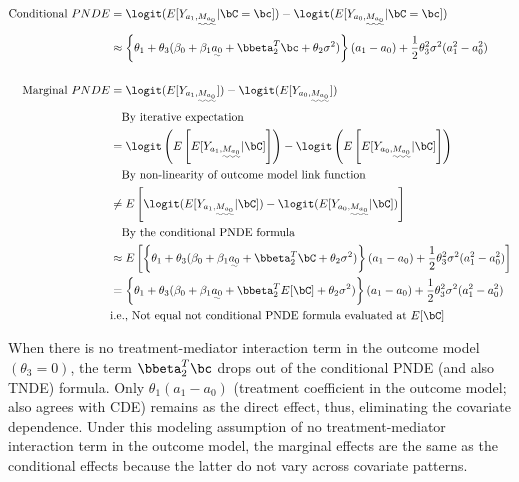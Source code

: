 \documentclass[10pt]{article}
\begin{document}
\begin{align*}
  \text{Conditional }PNDE
  &= \logit(E[Y_{a_{1},\uwave{M_{a_{0}}}} | \bC = \bc]) - \logit(E[Y_{a_{0},\uwave{M_{a_{0}}}} | \bC = \bc])\\
  &\approx \left\{ \theta_{1} + \theta_{3}(\beta_{0} + \beta_{1}\uwave{a_{0}} + \bbeta_{2}^{T}\bc + \theta_{2}\sigma^{2}) \right\} (a_{1} - a_{0}) + \frac{1}{2} \theta_{3}^{2}\sigma^{2}(a_{1}^{2} - a_{0}^{2})\\
  \\
  \text{Marginal }PNDE
  &= \logit(E[Y_{a_{1},\uwave{M_{a_{0}}}}]) - \logit(E[Y_{a_{0},\uwave{M_{a_{0}}}}])\\
  &~~~\text{By iterative expectation}\\
  &= \logit\left(E \left[ E[Y_{a_{1},\uwave{M_{a_{0}}}} | \bC] \right]\right) - \logit\left(E \left[ E[Y_{a_{0},\uwave{M_{a_{0}}}} | \bC] \right]\right)\\
  &~~~\text{By non-linearity of outcome model link function}\\
  &\ne E \left[ \logit(E[Y_{a_{1},\uwave{M_{a_{0}}}} | \bC]) - \logit(E[Y_{a_{0},\uwave{M_{a_{0}}}} | \bC]) \right]\\
  &~~~\text{By the conditional PNDE formula}\\
  &\approx E \left[ \left\{ \theta_{1} + \theta_{3}(\beta_{0} + \beta_{1}\uwave{a_{0}} + \bbeta_{2}^{T}\bC + \theta_{2}\sigma^{2}) \right\} (a_{1} - a_{0}) + \frac{1}{2} \theta_{3}^{2}\sigma^{2}(a_{1}^{2} - a_{0}^{2}) \right]\\
  &= \left\{ \theta_{1} + \theta_{3}(\beta_{0} + \beta_{1}\uwave{a_{0}} + \bbeta_{2}^{T}E[\bC] + \theta_{2}\sigma^{2}) \right\} (a_{1} - a_{0}) + \frac{1}{2} \theta_{3}^{2}\sigma^{2}(a_{1}^{2} - a_{0}^{2})\\
  &\text{i.e., Not equal not conditional PNDE formula evaluated at }E[\bC]\\
\end{align*}

When there is no treatment-mediator interaction term in the outcome model \((\theta_{3} = 0)\), the term \(\bbeta_{2}^{T}\bc\) drops out of the conditional PNDE (and also TNDE) formula. Only \(\theta_{1}(a_{1} - a_{0})\) (treatment coefficient in the outcome model; also agrees with CDE) remains as the direct effect, thus, eliminating the covariate dependence. Under this modeling assumption of no treatment-mediator interaction term in the outcome model, the marginal effects are the same as the conditional effects because the latter do not vary across covariate patterns.
\end{document}
